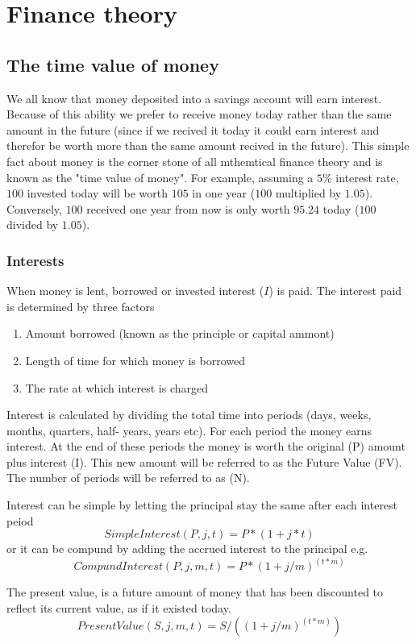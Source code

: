 \chapter{Finance theory}

\section{The time value of money}
We all know that money deposited into a savings account will earn interest.
Because of this ability we prefer to receive money today rather than the same 
amount in the future (since if we recived it today it could earn interest and therefor be worth more than the same amount recived in the future). This simple 
fact about money is the corner stone of all mthemtical finance theory and is 
known as the "time value of money". For example, assuming a $5\%$ interest rate, 
$100$ invested today will be worth $105$ in one year ($100$ multiplied by $1.05$).
Conversely, $100$ received one year from now is only worth $95.24$ today ($100$ 
divided by $1.05$).

\subsection{Interests}
When money is lent, borrowed or invested interest ($I$) is paid. The interest
paid is determined by three factors

\begin{enumerate}
    \item Amount borrowed (known as the principle or capital ammont)
    \item Length of time for which money is borrowed
    \item The rate at which interest is charged
\end{enumerate}

Interest is calculated by dividing the total time into periods (days, weeks,
months, quarters, half- years, years etc). For each period the money earns
interest. At the end of these periods the money is worth the original (P)
amount plus interest (I). This new amount will be referred to as the Future
Value (FV). The number of periods will be referred to as (N).

Interest can be simple by letting the principal stay the same after each
interest peiod
\[
    SimpleInterest(P,j,t) = P*(1+j*t)
\]
or it can be compund by adding the accrued interest to the principal e.g.
\[
    CompundInterest(P,j,m,t) = P*(1 + j/m)^(t*m)
\]

The present value, is a future amount of money that has been discounted to
reflect its current value, as if it existed today.
\[
    PresentValue(S,j,m,t) = S/((1 + j/m)^(t*m))
\]